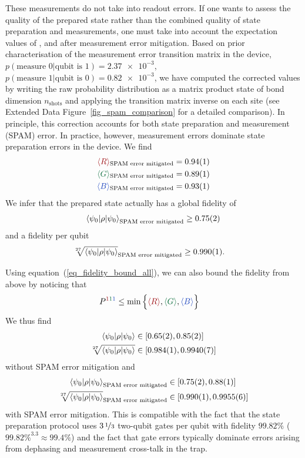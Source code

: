 \documentclass[nofootinbib,pra,twocolumn,showpacs,superscriptaddress,notitlepage,amsmath]{revtex4-2} %
\begin{document}
These measurements do not take into readout errors. If one wants to assess the quality of the prepared state rather than the combined quality of state preparation and measurements, one must take into account the expectation values of ,  and  after measurement error mitigation. Based on prior characterisation of the measurement error transition matrix in the device, $p(\text{measure } 0 | \text{qubit is } 1) = \num{2.37e-3}$, $p(\text{measure } 1 | \text{qubit is } 0) =  \num{0.82e-3}$, we have computed the corrected values by writing the raw probability distribution as a matrix product state of bond dimension $n_\mathrm{shots}$ and applying the transition matrix inverse on each site (see Extended Data Figure~\ref{fig_spam_comparison} for a detailed comparison). In principle, this correction accounts for both state preparation and measurement (SPAM) error. In practice, however, measurement errors dominate state preparation errors in the device.
We find
\begin{align}
\begin{split}
    \red{\braket{R}}_{\text{SPAM error mitigated}} &= 0.94(1) \\
    \green{\braket{G}}_{\text{SPAM error mitigated}} &= 0.89(1) \\
    \blue{\braket{B}}_{\text{SPAM error mitigated}} &= 0.93(1)
\end{split}
\end{align}
We infer that the prepared state actually has a global fidelity of
\begin{align}
    \braket{\psi_0 | \rho | \psi_0}_{\text{SPAM error mitigated}} \geq 0.75(2)
\end{align}
and a fidelity per qubit
\begin{align}
    \sqrt[27]{\braket{\psi_0 | \rho | \psi_0}}_{\text{SPAM error mitigated}} & \geq 0.990(1).
\end{align}

Using equation~(\ref{eq_fidelity_bound_all}), we can also bound the fidelity from above by noticing that
\begin{align}
    P^{\red{1} \green{1} \blue{1}} &\leq \min\Big\{ \red{\braket{R}},\green{\braket{G}},\blue{\braket{B}}\Big\}
\end{align}
We thus find
\begin{align}
    \braket{\psi_0 | \rho | \psi_0} &\in [0.65(2), 0.85(2)] \\
    \sqrt[27]{\braket{\psi_0 | \rho | \psi_0}} &\in [0.984(1),0.9940(7)]
\end{align}
without SPAM error mitigation and 
\begin{align}
    \braket{\psi_0 | \rho | \psi_0}_{\text{SPAM error mitigated}} &\in [0.75(2),0.88(1)] \\
    \sqrt[27]{\braket{\psi_0 | \rho | \psi_0}}_{\text{SPAM error mitigated}} &\in [0.990(1), 0.9955(6)]
\end{align}
with SPAM error mitigation. This is compatible with the fact that the state preparation protocol uses  $3 \, \nicefrac{1}{3}$ two-qubit gates per qubit with fidelity $99.82\%$ ($99.82\%^{3.3} \approx 99.4\%$) and the fact that gate errors typically dominate errors arising from dephasing and measurement cross-talk in the trap.
\end{document}
